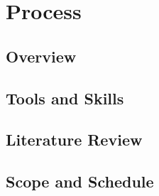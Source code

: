\section{Process}
\subsection{Overview}



\subsection{Tools and Skills}



\newpage
\subsection{Literature Review}


\subsection{Scope and Schedule}
